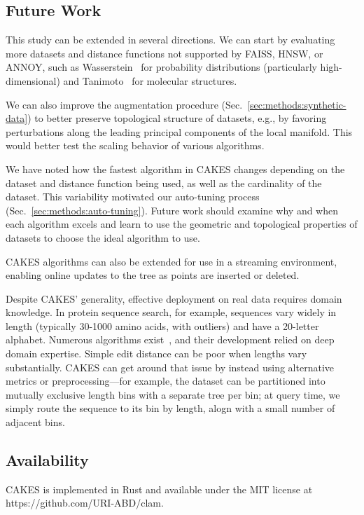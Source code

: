 \subsection{Future Work}

This study can be extended in several directions.
We can start by evaluating more datasets and distance functions not supported by FAISS, HNSW, or ANNOY, such as Wasserstein~\cite{vallender1974calculation} for probability distributions (particularly high-dimensional) and Tanimoto~\cite{bajusz2015tanimoto} for molecular structures.

We can also improve the augmentation procedure (Sec.~\ref{sec:methods:synthetic-data}) to better preserve topological structure of datasets, e.g., by favoring perturbations along the leading principal components of the local manifold.
This would better test the scaling behavior of various algorithms.

We have noted how the fastest algorithm in CAKES changes depending on the dataset and distance function being used, as well as the cardinality of the dataset.
This variability motivated our auto-tuning process (Sec.~\ref{sec:methods:auto-tuning}).
Future work should examine why and when each algorithm excels and learn to use the geometric and topological properties of datasets to choose the ideal algorithm to use.

CAKES algorithms can also be extended for use in a streaming environment, enabling online updates to the tree as points are inserted or deleted.

Despite CAKES' generality, effective deployment on real data requires domain knowledge.
In protein sequence search, for example, sequences vary widely in length (typically 30-1000 amino acids, with outliers) and have a 20-letter alphabet.
Numerous algorithms exist~\cite{kim2021entrance, daniels2013compressive, yu2015entropy, steinegger2018clustering}, and their development relied on deep domain expertise.
Simple edit distance can be poor when lengths vary substantially.
CAKES can get around that issue by instead using alternative metrics or preprocessing—for example, the dataset can be partitioned into mutually exclusive length bins with a separate tree per bin;
at query time, we simply route the sequence to its bin by length, alogn with a small number of adjacent bins.

\subsection{Availability}

CAKES is implemented in Rust and available under the MIT license at https://github.com/URI-ABD/clam.
